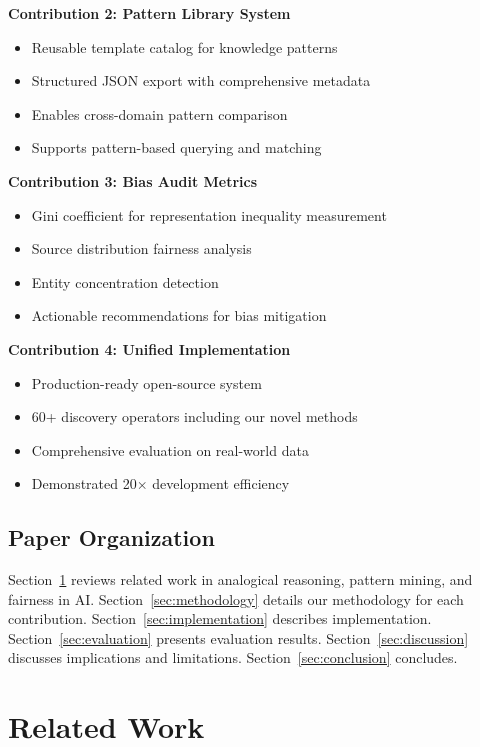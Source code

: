 \documentclass[11pt,twocolumn]{article}
\begin{document}
\textbf{Contribution 2: Pattern Library System}
\begin{itemize}
\item Reusable template catalog for knowledge patterns
\item Structured JSON export with comprehensive metadata
\item Enables cross-domain pattern comparison
\item Supports pattern-based querying and matching
\end{itemize}

\textbf{Contribution 3: Bias Audit Metrics}
\begin{itemize}
\item Gini coefficient for representation inequality measurement
\item Source distribution fairness analysis
\item Entity concentration detection
\item Actionable recommendations for bias mitigation
\end{itemize}

\textbf{Contribution 4: Unified Implementation}
\begin{itemize}
\item Production-ready open-source system
\item 60+ discovery operators including our novel methods
\item Comprehensive evaluation on real-world data
\item Demonstrated 20$\times$ development efficiency
\end{itemize}

\subsection{Paper Organization}

Section~\ref{sec:related} reviews related work in analogical reasoning, pattern mining, and fairness in AI. Section~\ref{sec:methodology} details our methodology for each contribution. Section~\ref{sec:implementation} describes implementation. Section~\ref{sec:evaluation} presents evaluation results. Section~\ref{sec:discussion} discusses implications and limitations. Section~\ref{sec:conclusion} concludes.

\section{Related Work}
\label{sec:related}
\end{document}
